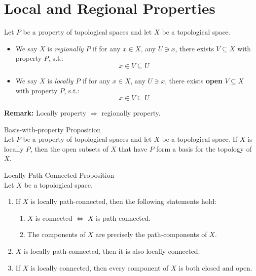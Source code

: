 \section{Local and Regional Properties}

\begin{definition}
    Let $P$ be a property of topological spaces and let $X$ be a topological space.
    \begin{itemize}
        \item We say $X$ is \textit{regionally $P$} if for any $x \in X$, any $U \ni x$, there exists $V \subseteq X$ with property $P$, s.t.:
        $$x \in V \subseteq U$$
        \item We say $X$ is \textit{locally $P$} if for any $x \in X$, any $U \ni x$, there exists \textbf{open} $V \subseteq X$ with property $P$, s.t.:
        $$x \in V \subseteq U$$
    \end{itemize}
\end{definition}

\noindent\textbf{Remark:} Locally property $\Rightarrow$ regionally property.

\begin{proposition}{Basis-with-property Proposition}\\
Let $P$ be a property of topological spaces and let $X$ be a topological space. If $X$ is locally $P$, then the open subsets of $X$ that have $P$ form a basis for the topology of $X$.
\end{proposition}

\begin{proposition}{Locally Path-Connected Proposition}\\
Let $X$ be a topological space.
\begin{enumerate}
    \item If $X$ is locally path-connected, then the following statements hold:
    \begin{enumerate}
        \item $X$ is connected $\Leftrightarrow$ $X$ is path-connected.
        \item The components of $X$ are precisely the path-components of $X$.
    \end{enumerate}
    \item $X$ is locally path-connected, then it is also locally connected.
    \item If $X$ is locally connected, then every component of $X$ is both closed and open.
\end{enumerate}
\end{proposition}


